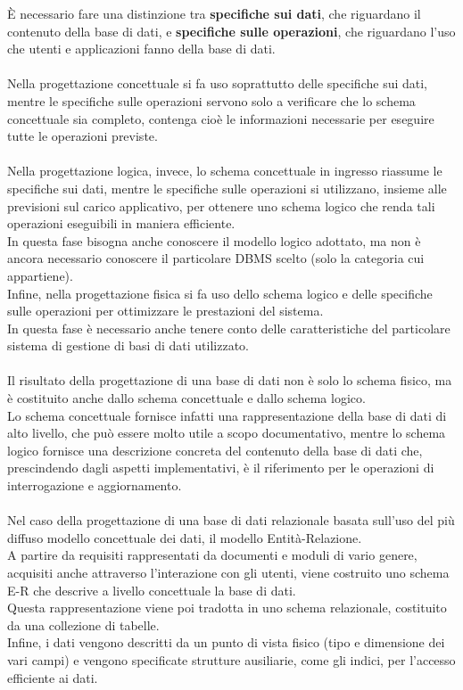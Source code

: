 È necessario fare una distinzione tra \textbf{specifiche sui dati}, che riguardano il contenuto della base di dati, e \textbf{specifiche sulle operazioni}, che riguardano l'uso che utenti e applicazioni fanno della base di dati.\\\\
Nella progettazione concettuale si fa uso soprattutto delle specifiche sui dati, mentre le specifiche sulle operazioni servono solo a verificare che lo schema concettuale sia completo, contenga cioè le informazioni necessarie per eseguire tutte le operazioni previste.\\\\
Nella progettazione logica, invece, lo schema concettuale in ingresso riassume le specifiche sui dati, mentre le specifiche sulle operazioni si utilizzano, insieme alle previsioni sul carico applicativo, per ottenere uno schema logico che renda tali operazioni eseguibili in maniera efficiente.\\
In questa fase bisogna anche conoscere il modello logico adottato, ma non è ancora necessario conoscere il particolare DBMS scelto (solo la categoria cui appartiene).\\
Infine, nella progettazione fisica si fa uso dello schema logico e delle specifiche sulle operazioni per ottimizzare le prestazioni del sistema.\\
In questa fase è necessario anche tenere conto delle caratteristiche del particolare sistema di gestione di basi di dati utilizzato.\\\\
Il risultato della progettazione di una base di dati non è solo lo schema fisico, ma è costituito anche dallo schema concettuale e dallo schema logico.\\
Lo schema concettuale fornisce infatti una rappresentazione della base di dati di alto livello, che può essere molto utile a scopo documentativo, mentre lo schema logico fornisce una descrizione concreta del contenuto della base di dati che, prescindendo dagli aspetti implementativi, è il riferimento per le operazioni di interrogazione e aggiornamento.\\\\
Nel caso della progettazione di una base di dati relazionale basata sull'uso del più diffuso modello concettuale dei dati, il modello Entità-Relazione.\\
A partire da requisiti rappresentati da documenti e moduli di vario genere, acquisiti anche attraverso l'interazione con gli utenti, viene costruito uno schema E-R che descrive a livello concettuale la base di dati.\\
Questa rappresentazione viene poi tradotta in uno schema relazionale, costituito da una collezione di tabelle.\\
Infine, i dati vengono descritti da un punto di vista fisico (tipo e dimensione dei vari campi) e vengono specificate strutture ausiliarie, come gli indici, per l'accesso efficiente ai dati.




